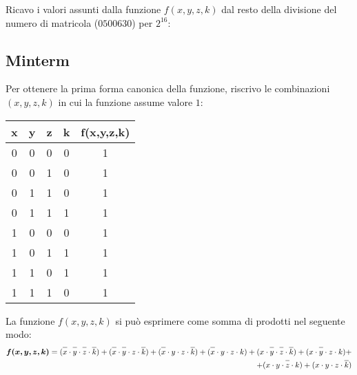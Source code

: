 \documentclass{article}
\newcommand*{\oline}[1]{\overline{#1\mathstrut}}
\begin{document}
Ricavo i valori assunti dalla funzione $f(x,y,z,k)$ dal resto della divisione del numero di matricola ($0500630$) per $2^{16}$:\\

\newpage

\subsection*{Minterm}
Per ottenere la prima forma canonica della funzione, riscrivo le combinazioni $(x,y,z,k)$ in cui la funzione assume valore $1$:\\
\begin{center}
  \begin{tabular}{|c|c|c|c|c|}
    \hline
    \textbf{x} & \textbf{y} & \textbf{z} & \textbf{k} & \textbf{f(x,y,z,k)} \\
    \hline
      0 & 0 & 0 & 0 & 1 \\
    \hline
      0 & 0 & 1 & 0 & 1 \\
    \hline
      0 & 1 & 1 & 0 & 1 \\
    \hline
      0 & 1 & 1 & 1 & 1 \\
    \hline
      1 & 0 & 0 & 0 & 1 \\
    \hline
      1 & 0 & 1 & 1 & 1 \\
    \hline
      1 & 1 & 0 & 1 & 1 \\
    \hline
      1 & 1 & 1 & 0 & 1 \\
    \hline
  \end{tabular}
\end{center}
La funzione $f(x,y,z,k)$ si può esprimere come somma di prodotti nel seguente modo:
\begin{align*}
  \bm{f(x,y,z,k)} = (\oline{x} \cdot \oline{y} \cdot \oline{z} \cdot \oline{k}) + (\oline{x} \cdot \oline{y}\cdot z \cdot \oline{k})
      + (\oline{x} \cdot y \cdot z \cdot \oline{k}) + (\oline{x} \cdot y \cdot z \cdot k) + (x \cdot \oline{y} \cdot \oline{z} \cdot \oline{k})
        + (x \cdot \oline{y} \cdot z \cdot k) + \\ + (x \cdot y \cdot \oline{z} \cdot k) + (x \cdot y \cdot z \cdot \oline{k})
\end{align*}
\end{document}
